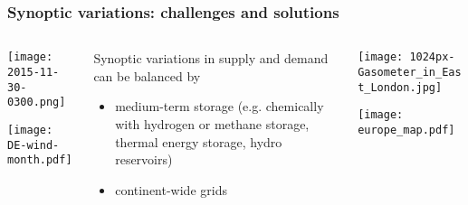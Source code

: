 \documentclass[10pt,aspectratio=169,dvipsnames]{beamer}
\let\olditem\item
\renewcommand{\item}{%
\olditem\vspace{5pt}}
\begin{document}
\begin{frame}
  \frametitle{Synoptic variations: challenges and solutions}

  \begin{columns}[T]
    \begin{column}{5cm}
      \texttt{[image: 2015-11-30-0300.png]}

      \vspace{.2cm}

      \texttt{[image: DE-wind-month.pdf]}
    \end{column}
    \begin{column}{4cm}
      Synoptic variations in supply and demand can be balanced by
      \begin{itemize}
      \item \alert{medium-term storage} (e.g. chemically with hydrogen or methane storage, thermal energy storage, hydro reservoirs)
      \item \alert{continent-wide grids}
      \end{itemize}

    \end{column}
    \begin{column}{5cm}
      \texttt{[image: 1024px-Gasometer\_in\_East\_London.jpg]}

      \texttt{[image: europe\_map.pdf]}
    \end{column}
  \end{columns}

\end{frame}
\end{document}
